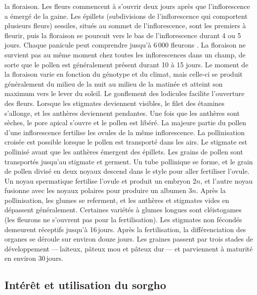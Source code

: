 \documentclass[a4paper,11pt]{article}
\begin{document}
la floraison. Les fleurs commencent à s'ouvrir deux jours après que
l'inflorescence a émergé de la gaine. Les épillets (subdivisions de
l'inflorescence qui comportent plusieurs fleurs) sessiles, situés au
sommet de l'inflorescence, sont les premiers à fleurir, puis la
floraison se poursuit vers le bas de l'inflorescence durant 4 ou 5
jours. Chaque panicule peut comprendre jusqu'à 6\,000 fleurons
\cite{QUINBYKARPER_1947}. La floraison ne survient pas au même moment
chez toutes les inflorescences dans un champ, de sorte que le pollen
est généralement présent durant 10 à 15 jours. Le moment de la
floraison varie en fonction du génotype et du climat, mais celle-ci se
produit généralement du milieu de la nuit au milieu de la matinée et
atteint son maximum vers le lever du soleil. Le gonflement des
lodicules facilite l'ouverture des fleurs. Lorsque les stigmates
deviennent visibles, le filet des étamines s'allonge, et les anthères
deviennent pendantes. Une fois que les anthères sont sèches, le pore
apical s'ouvre et le pollen est libéré. La majeure partie du pollen
d'une inflorescence fertilise les ovules de la même inflorescence. La
pollinisation croisée est possible lorsque le pollen est transporté
dans les airs. Le stigmate est pollinisé avant que les anthères
émergent des épillets. Les grains de pollen sont transportés jusqu'au
stigmate et germent. Un tube pollinique se forme, et le grain de
pollen divisé en deux noyaux descend dans le style pour aller
fertiliser l'ovule. Un noyau spermatique fertilise l'ovule et produit
un embryon $2n$, et l'autre noyau fusionne avec les noyaux polaires
pour produire un albumen $3n$. Après la pollinisation, les glumes se
referment, et les anthères et stigmates vides en dépassent
généralement. Certaines variétés à glumes longues sont cléistogames
(les fleurons ne s'ouvrent pas pour la fertilisation). Les stigmates
non fécondés demeurent réceptifs jusqu'à 16\,jours. Après la
fertilisation, la différenciation des organes se déroule sur environ
douze jours. Les graines passent par trois stades de développement
---\,laiteux, pâteux mou et pâteux dur\,--- et parviennent à maturité
en environ 30\,jours.

\subsection{Intérêt et utilisation du sorgho}
\end{document}
